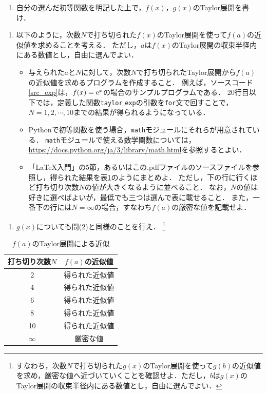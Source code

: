 \documentclass[a4paper,12pt]{jsarticle}
\begin{document}
\begin{enumerate}
    \item[(1)] 自分の選んだ初等関数を明記した上で，$f(x)$，$g(x)$のTaylor展開を書け．
\end{enumerate}

\begin{enumerate}   
    \item[(2)] 以下のように，次数$N$で打ち切られた$f(x)$のTaylor展開を使って$f(a)$の近似値を求めることを考える．
    ただし，$a$は$f(x)$のTaylor展開の収束半径内にある数値とし，自由に選んでよい．
    \begin{itemize}
        \item 与えられた$a$と$N$に対して，次数$N$で打ち切られたTaylor展開から$f(a)$の近似値を求めるプログラムを作成すること．
        例えば，ソースコード\ref{src_exp}は，$f(x)={\rm e}^{x}$の場合のサンプルプログラムである．
        20行目以下では，定義した関数\texttt{taylor$\_$exp}の引数を\texttt{for}文で回すことで，$N=1,2,\cdots,10$までの結果が得られるようになっている．
        \item Pythonで初等関数を使う場合，\texttt{math}モジュールにそれらが用意されている．
        \texttt{math}モジュールで使える数学関数については，\url{https://docs.python.org/ja/3/library/math.html}を参照するとよい．
        \item 「\LaTeX 入門」の5節，あるいはこの.pdfファイルのソースファイルを参照し，得られた結果を表\ref{tab:sample}のようにまとめよ．
        ただし，下の行に行くほど打ち切り次数$N$の値が大きくなるように並べること．
        なお，$N$の値は好きに選べばよいが，最低でも三つは選んで表に載せること．
        また，一番下の行には$N=\infty$の場合，すなわち$f(a)$の厳密な値を記載せよ．
    \end{itemize}
\end{enumerate}

\begin{enumerate}   
    \item[(3)] $g(x)$についても問(2)と同様のことを行え．
    \footnote{
    すなわち，次数$N$で打ち切られた$g(x)$のTaylor展開を使って$g(b)$の近似値を求め，厳密な値へ近づいていくことを確認せよ．ただし，$b$は$g(x)$のTaylor展開の収束半径内にある数値とし，自由に選んでよい．
    }
\end{enumerate}

\begin{table}[H]
    \centering
    \caption{$f(a)$のTaylor展開による近似}
    \begin{tabular}{c|c}
        \hline
        打ち切り次数$N$ & $f(a)$の近似値  \\
        \hline\hline
        2 & 得られた近似値 \\ 
        4 & 得られた近似値 \\ 
        6 & 得られた近似値 \\ 
        8 & 得られた近似値 \\ 
        10 & 得られた近似値 \\ 
        $\infty$ & 厳密な値 \\ 
        \hline
    \end{tabular}
    \label{tab:sample}
\end{table}
\end{document}
